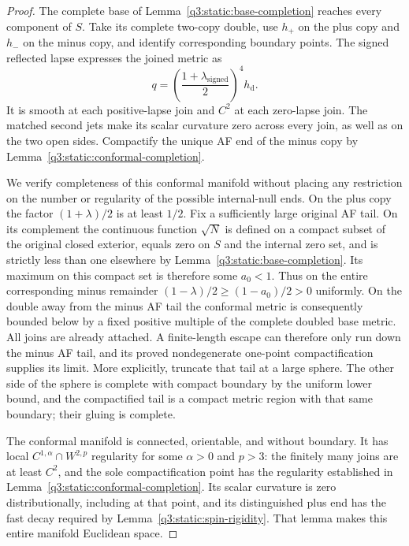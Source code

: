 \begin{proof}
The complete base of Lemma~\ref{q3:static:base-completion} reaches every
component of $S$. Take its complete two-copy double, use $h_+$ on
the plus copy and $h_-$ on the minus copy, and identify corresponding
boundary points. The signed reflected lapse expresses the joined
metric as
\[
q=\left(\frac{1+\lambda_{\mathrm{signed}}}{2}\right)^4h_{\mathrm d}.
\]
It is smooth at each positive-lapse join and $C^2$ at each zero-lapse
join. The matched second jets make its scalar curvature zero across
every join, as well as on the two open sides. Compactify the unique
AF end of the minus copy by
Lemma~\ref{q3:static:conformal-completion}.

We verify completeness of this conformal manifold without placing any
restriction on the number or regularity of the possible internal-null
ends. On the plus copy the factor $(1+\lambda)/2$ is at least $1/2$.
Fix a sufficiently large original AF tail. On its complement the
continuous function $\sqrt N$ is defined on a compact subset of the
original closed exterior, equals zero on $S$ and the internal zero
set, and is strictly less than one elsewhere by
Lemma~\ref{q3:static:base-completion}. Its maximum on this compact set
is therefore some $a_0<1$. Thus on the entire corresponding minus
remainder $(1-\lambda)/2\geq(1-a_0)/2>0$ uniformly. On the double
away from the minus AF tail the conformal metric is consequently
bounded below by a fixed positive multiple of the complete doubled
base metric. All joins are already attached. A finite-length escape
can therefore only run down the minus AF tail, and its proved
nondegenerate one-point compactification supplies its limit. More
explicitly, truncate that tail at a large sphere. The other side of
the sphere is complete with compact boundary by the uniform lower
bound, and the compactified tail is a compact metric region with
that same boundary; their gluing is complete.

The conformal manifold is connected, orientable, and without boundary.
It has local $C^{1,\alpha}\cap W^{2,p}$ regularity for some
$\alpha>0$ and $p>3$: the finitely many joins are at least $C^2$,
and the sole compactification point has the regularity established
in Lemma~\ref{q3:static:conformal-completion}. Its scalar curvature is
zero distributionally, including at that point, and its distinguished
plus end has the fast decay required by
Lemma~\ref{q3:static:spin-rigidity}. That lemma makes this entire
manifold Euclidean space.


\end{proof}
